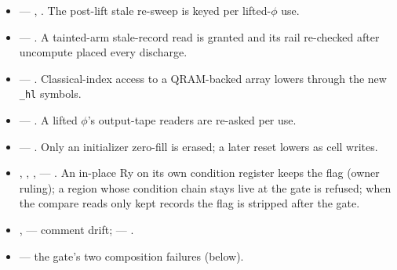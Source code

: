 \begin{itemize}
  component and grows on an open root or a forced record; the post-collapse read test is
  per activation; the dead-terminal reversal is placed after a trailing gate.
  \allowbreak{} flipped to accept
  (owner ruling above).
  \item {} --- , . The post-lift stale re-sweep is
  keyed per lifted-$\phi$ use.
  \item {} --- . A tainted-arm stale-record read is granted and
  its rail re-checked after uncompute placed every discharge.
  \item {} --- . Classical-index access to a QRAM-backed array
  lowers through the new \texttt{\_hl} symbols.
  \item {} --- . A lifted $\phi$'s output-tape readers are
  re-asked per use.
  \item {} --- . Only an initializer zero-fill is erased; a
  later reset lowers as cell writes.
  \item {}, , ,  ---
  . An in-place Ry on its own condition register keeps the flag (owner
  ruling); a region whose condition chain stays live at the gate is refused; when the
  compare reads only kept records the flag is stripped after the gate.
  \item {},  --- comment drift;  ---
  .
  \item {} --- the gate's two composition failures (below).
\end{itemize}

